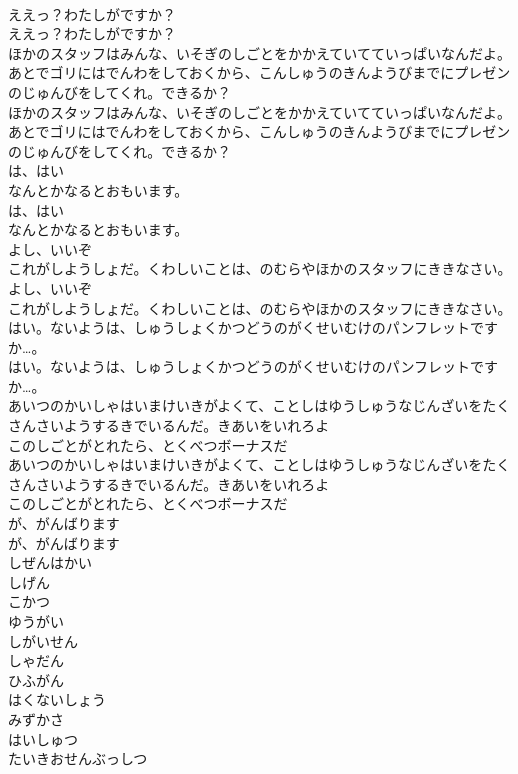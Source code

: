 \documentclass[8pt]{extreport}
\begin{document}
\begin{CJK}{UTF8}{min}
\\	ええっ？わたしがですか？
\\	ええっ？わたしがですか？
\\	ほかのスタッフはみんな、いそぎのしごとをかかえていてていっぱいなんだよ。あとでゴリにはでんわをしておくから、こんしゅうのきんようびまでにプレゼンのじゅんびをしてくれ。できるか？
\\	ほかのスタッフはみんな、いそぎのしごとをかかえていてていっぱいなんだよ。あとでゴリにはでんわをしておくから、こんしゅうのきんようびまでにプレゼンのじゅんびをしてくれ。できるか？
\\	は、はい
\\	なんとかなるとおもいます。
\\	は、はい
\\	なんとかなるとおもいます。
\\	よし、いいぞ
\\	これがしようしょだ。くわしいことは、のむらやほかのスタッフにききなさい。
\\	よし、いいぞ
\\	これがしようしょだ。くわしいことは、のむらやほかのスタッフにききなさい。
\\	はい。ないようは、しゅうしょくかつどうのがくせいむけのパンフレットですか…。
\\	はい。ないようは、しゅうしょくかつどうのがくせいむけのパンフレットですか…。
\\	あいつのかいしゃはいまけいきがよくて、ことしはゆうしゅうなじんざいをたくさんさいようするきでいるんだ。きあいをいれろよ
\\	このしごとがとれたら、とくべつボーナスだ
\\	あいつのかいしゃはいまけいきがよくて、ことしはゆうしゅうなじんざいをたくさんさいようするきでいるんだ。きあいをいれろよ
\\	このしごとがとれたら、とくべつボーナスだ
\\	が、がんばります
\\	が、がんばります
\\	しぜんはかい
\\	しげん
\\	こかつ
\\	ゆうがい
\\	しがいせん
\\	しゃだん
\\	ひふがん
\\	はくないしょう
\\	みずかさ
\\	はいしゅつ
\\	たいきおせんぶっしつ

\end{CJK}
\end{document}
